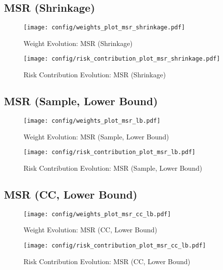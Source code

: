 \documentclass{article}
\begin{document}
\subsection{MSR (Shrinkage)}
\begin{figure}[H]
    \centering
    \texttt{[image: config/weights\_plot\_msr\_shrinkage.pdf]}
    \caption{Weight Evolution: MSR (Shrinkage)}
    \label{fig:weights_msr_shrinkage}
\end{figure}
\begin{figure}[H]
    \centering
    \texttt{[image: config/risk\_contribution\_plot\_msr\_shrinkage.pdf]}
    \caption{Risk Contribution Evolution: MSR (Shrinkage)}
    \label{fig:risk_contribution_msr_shrinkage}
\end{figure}
\clearpage

\subsection{MSR (Sample, Lower Bound)}
\begin{figure}[H]
    \centering
    \texttt{[image: config/weights\_plot\_msr\_lb.pdf]}
    \caption{Weight Evolution: MSR (Sample, Lower Bound)}
    \label{fig:weights_msr_lb}
\end{figure}
\begin{figure}[H]
    \centering
    \texttt{[image: config/risk\_contribution\_plot\_msr\_lb.pdf]}
    \caption{Risk Contribution Evolution: MSR (Sample, Lower Bound)}
    \label{fig:risk_contribution_msr_lb}
\end{figure}
\clearpage

\subsection{MSR (CC, Lower Bound)}
\begin{figure}[H]
    \centering
    \texttt{[image: config/weights\_plot\_msr\_cc\_lb.pdf]}
    \caption{Weight Evolution: MSR (CC, Lower Bound)}
    \label{fig:weights_msr_cc_lb}
\end{figure}
\begin{figure}[H]
    \centering
    \texttt{[image: config/risk\_contribution\_plot\_msr\_cc\_lb.pdf]}
    \caption{Risk Contribution Evolution: MSR (CC, Lower Bound)}
    \label{fig:risk_contribution_msr_cc_lb}
\end{figure}
\clearpage
\end{document}
